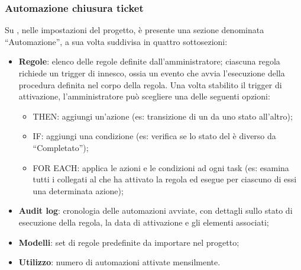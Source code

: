 \subsubsection{Automazione chiusura ticket}
\par Su , nelle impostazioni del progetto, è presente una sezione denominata “Automazione”, a sua volta suddivisa in quattro sottosezioni:
\begin{itemize}
  \item \textbf{Regole}: elenco delle regole definite dall'amministratore; ciascuna regola richiede un trigger di innesco, ossia un evento che avvia l'esecuzione della procedura definita nel corpo della regola. Una volta stabilito il trigger di attivazione, l’amministratore può scegliere una delle seguenti opzioni:
  \begin{itemize}  
    \item THEN: aggiungi un'azione (es: transizione di un  da uno stato all'altro);
    \item IF: aggiungi una condizione (es: verifica se lo stato del  è diverso da “Completato”);
    \item FOR EACH: applica le azioni e le condizioni ad ogni task (es: esamina tutti i  collegati al  che ha attivato la regola ed esegue per ciascuno di essi una determinata azione);
  \end{itemize}
  \item \textbf{Audit log}: cronologia delle automazioni avviate, con dettagli sullo stato di esecuzione della regola, la data di attivazione e gli elementi associati;
  \item \textbf{Modelli}: set di regole predefinite da importare nel progetto;
  \item \textbf{Utilizzo}: numero di automazioni attivate mensilmente.
\end{itemize}

